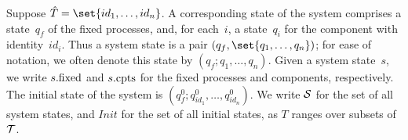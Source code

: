 \begin{definition}
Suppose $\hat{T} = \set{id_1,\ldots,id_n}$.  A corresponding state of the
system comprises a state~$q_f$ of the fixed processes, and, for each~$i$, a
state~$q_i$ for the component with identity~$id_i$.  Thus a system state is a
pair $(q_f, \set{q_1,\ldots,q_n})$; for ease of notation, we often denote this
state by $(q_f; q_1,\ldots,q_n)$.  Given a system state~$s$, we write
$s.\fixed$ and $s.\cpt$ for the fixed processes and components, respectively.
The initial state of the system is $(q^0_{f}; q^0_{id_1}, \ldots,
q^0_{id_n})$.  We write $\S$ for the set of all system states, and $Init$ for
the set of all initial states, as $T$ ranges over subsets of~$\T$.



\end{definition}
